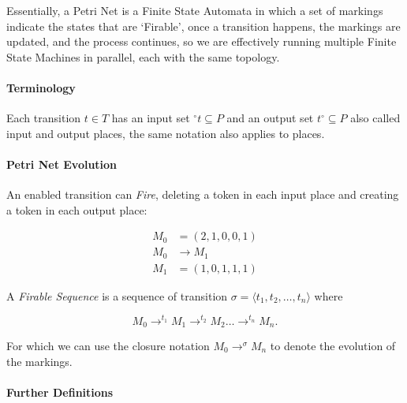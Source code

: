 \documentclass[openright, twoside, twocolumn, a4paper, 10pt]{report}
\begin{document}
Essentially, a Petri Net is a Finite State Automata in which a set of markings indicate the states that are `Firable', once a transition
happens, the markings are updated, and the process continues, so we are effectively running multiple Finite State Machines
in parallel, each with the same topology.

\paragraph{Terminology}

Each transition $t \in  T$  has an input set ${}^{\circ}t \subseteq P$ and an output set $t^{\circ} \subseteq  P$ also called input
and output places, the same notation also applies to places.

\paragraph{Petri Net Evolution}

An enabled transition can \emph{Fire}, deleting a token in each input place and creating a token in each output place:

\begin{align*}
	M_0 & = \left( 2, 1, 0, 0, 1 \right) \\
	M_0 & \to M_1                        \\
	M_1 & = \left( 1, 0, 1, 1, 1 \right)
\end{align*}

A \emph{Firable Sequence} is a sequence of transition $\sigma = \langle t_1, t_2, \ldots, t_n \rangle$ where

\[
	M_0 \to^{ t_1} M_1 \to^{ t_2} M_2 \ldots \to^{ t_n} M_n
	.\]

For which we can use the closure notation $ M_0 \to^{\sigma} M_n$ to denote the evolution of the markings.

\paragraph{Further Definitions}
\end{document}

